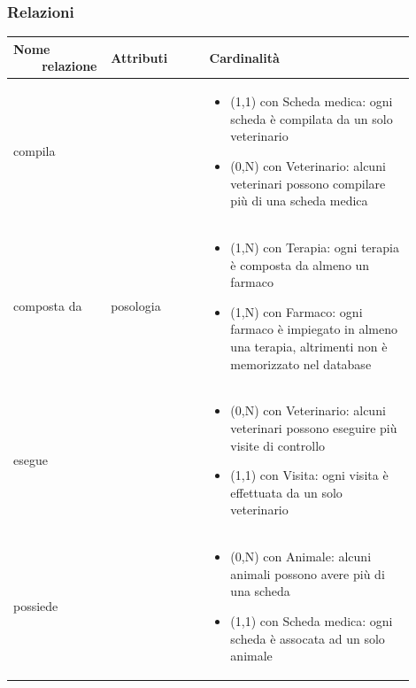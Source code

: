 \documentclass[12pt,a4paper]{article}
\begin{document}
\subsubsection{Relazioni}
\label{Healthcare Relazioni}
\begin{center}

\setlength{\extrarowheight}{1.5pt}

\begin{longtable}{|p{0.16\linewidth}|p{0.24\linewidth}|p{0.50\linewidth}|}
\hline 
\textbf{Nome \ \ \ \ relazione} 	& \textbf{Attributi} & \textbf{Cardinalità}\\ 

    
\hline
compila 				&   
					& \begin{itemize}
						\setlength{\itemindent}{-1em}
						\vspace{-15pt}
						\setlength\itemsep{-0.25em}
						\item (1,1) con Scheda medica: ogni scheda è compilata da un solo veterinario
						\item (0,N) con Veterinario: alcuni veterinari possono compilare più di una scheda medica
					\end{itemize}\\ 

\hline
composta da 				&  posologia 
					& \begin{itemize}
						\setlength{\itemindent}{-1em}
						\vspace{-25pt}
						\setlength\itemsep{-0.25em}
						\item (1,N) con Terapia: ogni terapia è composta da almeno un farmaco
						\item (1,N) con Farmaco: ogni farmaco è impiegato in almeno una terapia, altrimenti non è memorizzato nel database
					\end{itemize}\\ 

\hline
esegue 				&   
					& \begin{itemize}
						\setlength{\itemindent}{-1em}
						\vspace{-25pt}
						\setlength\itemsep{-0.25em}
						\item (0,N) con Veterinario: alcuni veterinari possono eseguire più visite di controllo
						\item (1,1) con Visita: ogni visita è effettuata da un solo veterinario
					\end{itemize}\\ 

\hline
possiede 				&   
					& \begin{itemize}
						\setlength{\itemindent}{-1em}
						\vspace{-25pt}
						\setlength\itemsep{-0.25em}
						\item (0,N) con Animale: alcuni animali possono avere più di una scheda
						\item (1,1) con Scheda medica: ogni scheda è assocata ad un solo animale
					\end{itemize}\\ 


\end{longtable}
\end{center}
\end{document}
